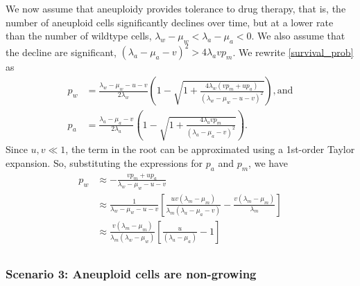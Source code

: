 \documentclass[12pt]{extarticle}
\begin{document}
We now assume that aneuploidy provides tolerance to drug therapy, that is, the number of aneuploid cells significantly declines over time, but at a lower rate than the number of wildtype cells, $\lambda_w - \mu_w < \lambda_a - \mu_a < 0$. We also assume that the decline are significant, $\left(\lambda_a-\mu_a-v\right)^2 > 4\lambda_a v p_m$.
We rewrite \cref{survival_prob} as
\begin{equation}
\begin{aligned}
p_w&=\frac{\lambda_w-\mu_w-u-v}{2\lambda_w}\left(1-\sqrt{1+\frac{4\lambda_w\left(vp_m+up_a\right)}{\left(\lambda_w-\mu_w-u-v\right)^2}}\right) ,
\text{and} \\
p_a&=\frac{\lambda_a-\mu_a-v}{2\lambda_a}\left(1-\sqrt{1+\frac{4\lambda_avp_m}{\left(\lambda_a-\mu_a-v\right)^2}}\right) .
\end{aligned}
\end{equation}
Since $u,v\ll1$, the term in the root can be approximated using a 1st-order Taylor expansion. So, substituting the expressions for $p_a$ and $p_m$, we have
\begin{equation}\label{survprobwinitial}
\begin{aligned}
p_w&\approx-\frac{vp_m+up_a}{\lambda_w-\mu_w-u-v}\\
&\approx\frac{1}{\lambda_w-\mu_w-u-v}\left[\frac{uv\left(\lambda_m-\mu_m\right)}{\lambda_m\left(\lambda_a-\mu_a-v\right)}-\frac{v\left(\lambda_m-\mu_m\right)}{\lambda_m}\right]\\ %
&\approx\frac{v\left(\lambda_m-\mu_m\right)}{\lambda_m\left(\lambda_w-\mu_w\right)}\left[\frac{u}{\left(\lambda_a-\mu_a\right)}-1\right]\\
\end{aligned}
\end{equation}

\subsubsection*{Scenario 3: Aneuploid cells are non-growing} %
\end{document}
